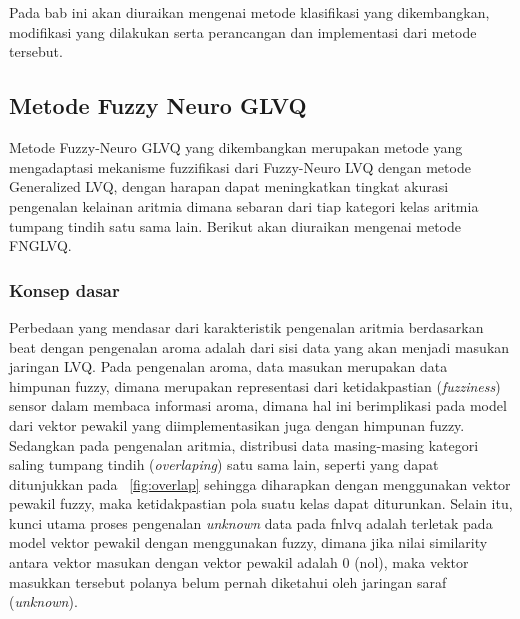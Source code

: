\chapter{\babEmpat}
Pada bab ini akan diuraikan mengenai metode klasifikasi yang dikembangkan,
modifikasi yang dilakukan serta perancangan dan implementasi dari metode
tersebut.

\section{Metode Fuzzy Neuro GLVQ}
Metode Fuzzy-Neuro GLVQ yang dikembangkan merupakan metode yang mengadaptasi
mekanisme fuzzifikasi dari Fuzzy-Neuro LVQ dengan metode Generalized LVQ, dengan
harapan dapat meningkatkan tingkat akurasi pengenalan kelainan aritmia dimana
sebaran dari tiap kategori kelas aritmia tumpang tindih satu sama lain. Berikut
akan diuraikan mengenai metode FNGLVQ.


\subsection{Konsep dasar}
Perbedaan yang mendasar dari karakteristik pengenalan aritmia berdasarkan beat
dengan pengenalan aroma adalah dari sisi data yang akan menjadi masukan
jaringan LVQ. Pada pengenalan aroma, data masukan merupakan data himpunan
fuzzy, dimana merupakan representasi dari ketidakpastian (\emph{fuzziness})
sensor dalam membaca informasi aroma, dimana hal ini berimplikasi pada model
dari vektor pewakil yang diimplementasikan juga dengan himpunan fuzzy. Sedangkan
pada pengenalan aritmia, distribusi data masing-masing kategori saling tumpang
tindih (\emph{overlaping}) satu sama lain, seperti yang dapat ditunjukkan pada
\pic~\ref{fig:overlap} sehingga diharapkan dengan menggunakan vektor pewakil
fuzzy, maka ketidakpastian pola suatu kelas dapat diturunkan. Selain itu, kunci
utama proses pengenalan \emph{unknown} data pada \gls{fnlvq} adalah terletak
pada model vektor pewakil dengan menggunakan fuzzy, dimana jika nilai
similarity antara vektor masukan dengan vektor pewakil adalah 0 (nol), maka
vektor masukkan tersebut polanya belum pernah diketahui oleh jaringan saraf
(\emph{unknown}).
 
